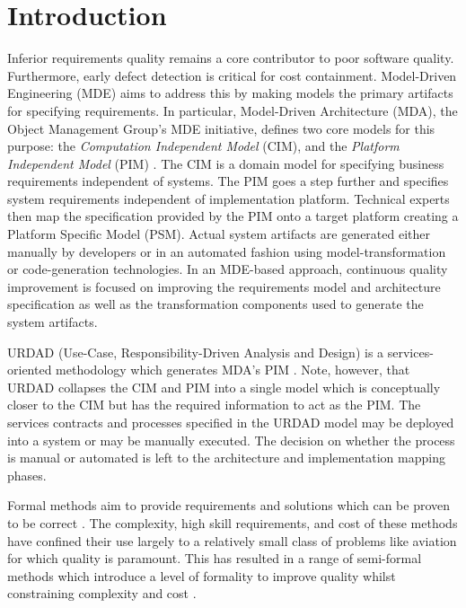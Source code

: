 \section{Introduction}
\label{sec:Introduction}

Inferior requirements quality remains a core contributor to poor software quality\cite{heck_experiences_2008,_strategies_2011}. Furthermore, early defect detection is critical for cost containment\cite{betterReferenceThanBoehm1981WhichReliesOnWaterfall}. Model-Driven Engineering (MDE) \cite{frankel_model_2003} aims to address this by making models the primary artifacts for specifying requirements. In particular, Model-Driven Architecture (MDA), the Object Management Group's MDE initiative, defines two core models for this purpose: the \emph{Computation Independent Model} (CIM), and the \emph{Platform Independent Model} (PIM) \cite{_mda_2003}. The CIM is a domain model for specifying business requirements independent of systems. The PIM goes a step further and specifies system requirements independent of implementation platform. Technical experts then map the specification provided by the PIM onto a target platform creating a {Platform Specific Model} (PSM). Actual system artifacts are generated either manually by developers or in an automated fashion using model-transformation or code-generation technologies. In an MDE-based approach, continuous quality improvement is focused on improving the requirements model and architecture specification as well as the transformation components used to generate the system artifacts.

URDAD (Use-Case, Responsibility-Driven Analysis and Design) \cite{solms_technology_2007} is a services-oriented methodology which generates MDA's PIM \cite{solms_generating_2009}. Note, however, that URDAD collapses the CIM and PIM into a single model which is conceptually closer to the CIM but has the required information to act as the PIM. The services contracts and processes specified in the URDAD model may be deployed into a system or may be manually executed. The decision on whether the process is manual or automated is left to the architecture and implementation mapping phases. 

Formal methods aim to provide requirements and solutions which can be proven to be correct \cite{hinchey_software_2008}. The complexity, high skill requirements, and cost of these methods have confined their use largely to a relatively small class of problems like aviation \cite{hall_software_1992} for which quality is paramount. This has resulted in a range of semi-formal methods which introduce a level of formality to improve quality whilst constraining complexity and cost \cite{}.

